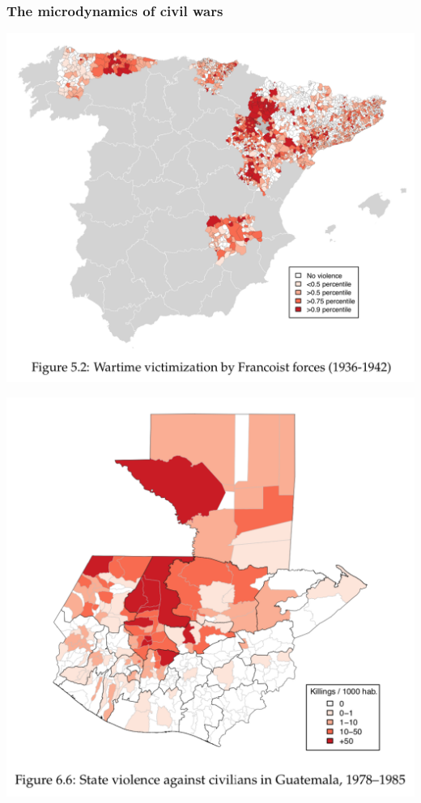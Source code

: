 \documentclass[utf8, xcolor=dvipsnames, handout]{beamer}
\begin{document}
\begin{frame}
\frametitle{The microdynamics of civil wars}
\centering

\begin{minipage}{0.59\textwidth}\centering
  \includegraphics[width = \textwidth]{img/dissplot_spain}
\end{minipage}\hfill
\begin{minipage}{0.4\textwidth}\centering
  \includegraphics[width = \textwidth]{img/dissplot_guatemala}\\

\end{minipage}
\end{frame}
\end{document}
